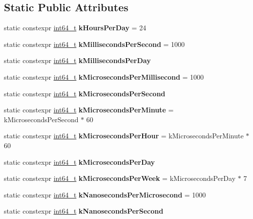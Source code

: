 \subsection*{Static Public Attributes}
\begin{DoxyCompactItemize}
\item 
\mbox{\label{classv8_1_1base_1_1TimeConstants_ad1f2bc70f64d14d09a7dde99491ec0d9}} 
static constexpr \mbox{\hyperlink{classint64__t}{int64\+\_\+t}} {\bfseries k\+Hours\+Per\+Day} = 24
\item 
\mbox{\label{classv8_1_1base_1_1TimeConstants_ad0495a90be57e1e77906fcaa98e9aece}} 
static constexpr \mbox{\hyperlink{classint64__t}{int64\+\_\+t}} {\bfseries k\+Milliseconds\+Per\+Second} = 1000
\item 
static constexpr \mbox{\hyperlink{classint64__t}{int64\+\_\+t}} {\bfseries k\+Milliseconds\+Per\+Day}
\item 
\mbox{\label{classv8_1_1base_1_1TimeConstants_ab4b6e441763075b96c53fd519bc1d31d}} 
static constexpr \mbox{\hyperlink{classint64__t}{int64\+\_\+t}} {\bfseries k\+Microseconds\+Per\+Millisecond} = 1000
\item 
static constexpr \mbox{\hyperlink{classint64__t}{int64\+\_\+t}} {\bfseries k\+Microseconds\+Per\+Second}
\item 
\mbox{\label{classv8_1_1base_1_1TimeConstants_a0237e3193571e87bd462a0f510a162b3}} 
static constexpr \mbox{\hyperlink{classint64__t}{int64\+\_\+t}} {\bfseries k\+Microseconds\+Per\+Minute} = k\+Microseconds\+Per\+Second $\ast$ 60
\item 
\mbox{\label{classv8_1_1base_1_1TimeConstants_a7c4eeecc507b4fbd1f2c11029d6070ae}} 
static constexpr \mbox{\hyperlink{classint64__t}{int64\+\_\+t}} {\bfseries k\+Microseconds\+Per\+Hour} = k\+Microseconds\+Per\+Minute $\ast$ 60
\item 
static constexpr \mbox{\hyperlink{classint64__t}{int64\+\_\+t}} {\bfseries k\+Microseconds\+Per\+Day}
\item 
\mbox{\label{classv8_1_1base_1_1TimeConstants_a1be52b23ffa59ed20fce1e7c005daccb}} 
static constexpr \mbox{\hyperlink{classint64__t}{int64\+\_\+t}} {\bfseries k\+Microseconds\+Per\+Week} = k\+Microseconds\+Per\+Day $\ast$ 7
\item 
\mbox{\label{classv8_1_1base_1_1TimeConstants_a7b7def4d913fbbad5793662bbc929fd7}} 
static constexpr \mbox{\hyperlink{classint64__t}{int64\+\_\+t}} {\bfseries k\+Nanoseconds\+Per\+Microsecond} = 1000
\item 
static constexpr \mbox{\hyperlink{classint64__t}{int64\+\_\+t}} {\bfseries k\+Nanoseconds\+Per\+Second}
\end{DoxyCompactItemize}


